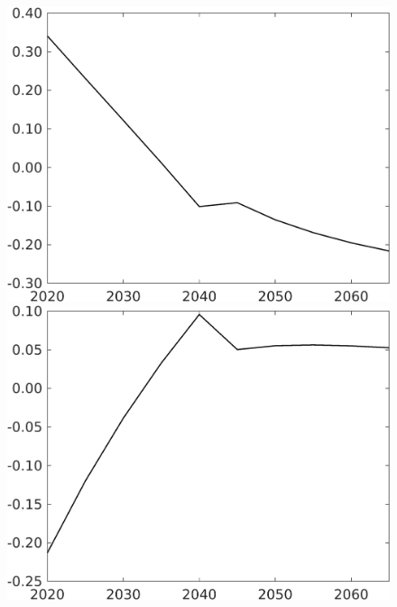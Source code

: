 \begin{figure}[h!!!]
\begin{minipage}[]{0.32\textwidth}
	\end{minipage}
	\begin{minipage}[]{0.32\textwidth}
		\includegraphics[width=1\textwidth]{../../codding_model/own_basedOnFried/optimalPol_010922_revision/figures/all_13Sept22_Tplus30/gAf_OPT_COMPtaulPer_regime4_spillover0_knspil0_noskill0_sep0_xgrowth0_PV1_etaa0.79.png}
	\end{minipage}
	\begin{minipage}[]{0.32\textwidth}
		\includegraphics[width=1\textwidth]{../../codding_model/own_basedOnFried/optimalPol_010922_revision/figures/all_13Sept22_Tplus30/gAg_OPT_COMPtaulPer_regime4_spillover0_knspil0_noskill0_sep0_xgrowth0_PV1_etaa0.79.png}

\end{minipage}
\end{figure}
